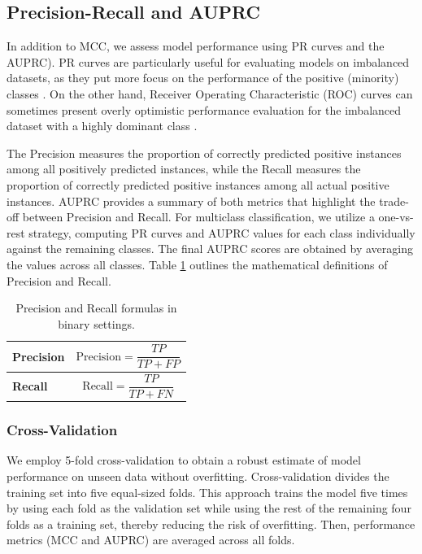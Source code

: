 \subsection{Precision-Recall and AUPRC}

In addition to \gls{MCC}, we assess model performance using \gls{PR} curves and the \gls{AUPRC}).  
 \gls{PR} curves are particularly useful for evaluating models on imbalanced datasets, as they put more focus on the performance of the positive (minority) classes \cite{saito2015precision}.
On the other hand, Receiver Operating Characteristic (ROC) curves can sometimes present overly optimistic performance evaluation for the imbalanced dataset with a highly dominant class \cite{saito2015precision}.

The Precision measures the proportion of correctly predicted positive instances among all positively predicted instances, while the Recall measures the proportion of correctly predicted positive instances among all actual positive instances.
\gls{AUPRC} provides a summary of both metrics that highlight the trade-off between Precision and Recall.
For multiclass classification, we utilize a one-vs-rest strategy, computing  \gls{PR} curves and  \gls{AUPRC} values for each class individually against the remaining classes.
The final \gls{AUPRC} scores are obtained by averaging the values across all classes.
Table \ref{tab:pr} outlines the mathematical definitions of Precision and Recall.

\begin{table}[h!]
	\centering
	\small
	\begin{tabular}{|l|p{10cm}|}
		\hline
		\textbf{Precision} &
		\[
		\text{Precision} = \frac{TP}{TP + FP}
		\]
		\\
		\hline
		\textbf{Recall} &
		\[
		\text{Recall} = \frac{TP}{TP + FN}
		\]
		\\
		\hline
		
		
	\end{tabular}
	\caption{Precision and Recall formulas in binary settings.}
	\label{tab:pr}
\end{table}

\subsubsection{Cross-Validation}

We employ 5-fold cross-validation to obtain a robust estimate of model performance on unseen data without overfitting.
Cross-validation divides the training set into five equal-sized folds.
This approach trains the model five times by using each fold as the validation set while using the rest of the remaining four folds as a training set, thereby reducing the risk of overfitting. Then, performance metrics (\gls{MCC} and \gls{AUPRC}) are averaged across all folds.


